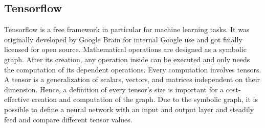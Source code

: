 \subsection{Tensorflow}
\label{sec:software-tensorflow}
Tensorflow \cite{tensorflow2015-whitepaper} is a free framework in particular for machine learning tasks.
It was originally developed by Google Brain for internal Google use and got finally licensed for open source. 
Mathematical operations are designed as a symbolic graph.
After its creation, any operation inside can be executed and only needs the computation of its dependent operations.
Every computation involves tensors.
A tensor is a generalization of scalars, vectors, and matrices independent on their dimension.
Hence, a definition of every tensor's size is important for a cost-effective creation and computation of the graph.
Due to the symbolic graph, it is possible to define a neural network with an input and output layer and steadily feed and compare different tensor values.